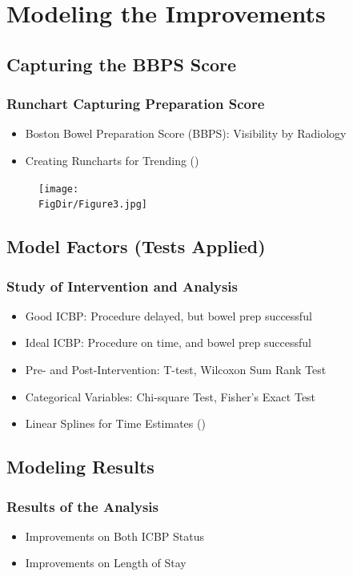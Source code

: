 \documentclass[pdflatex]{beamer}
\begin{document}
\section{Modeling the Improvements}
\subsection{Capturing the BBPS Score}
\begin{frame}
\frametitle{Runchart Capturing Preparation Score}
\begin{itemize}
    \item Boston Bowel Preparation Score (BBPS): Visibility by Radiology
    \item Creating Runcharts for Trending (\cite{Perla2011-dp})
\end{itemize}
    \begin{figure}
        \centerline{\texttt{[image: \\FigDir/Figure3.jpg]}}
    \end{figure}
\end{frame}

\subsection{Model Factors (Tests Applied)}
\begin{frame}
\frametitle{Study of Intervention and Analysis}
\begin{itemize}
  \item Good ICBP: Procedure delayed, but bowel prep successful 
  \item Ideal ICBP: Procedure on time, and bowel prep successful
\end{itemize}
\medskip
\begin{itemize}
    \item Pre- and Post-Intervention: T-test, Wilcoxon Sum Rank Test
    \item Categorical Variables: Chi-square Test, Fisher's Exact Test
    \item Linear Splines for Time Estimates (\cite{Johnson2014-nm})
\end{itemize}

\end{frame}

\subsection{Modeling Results}
\begin{frame}
\frametitle{Results of the Analysis}
\begin{itemize}
    \item Improvements on Both ICBP Status
    \item Improvements on Length of Stay
\end{itemize}

\end{frame}
\end{document}
